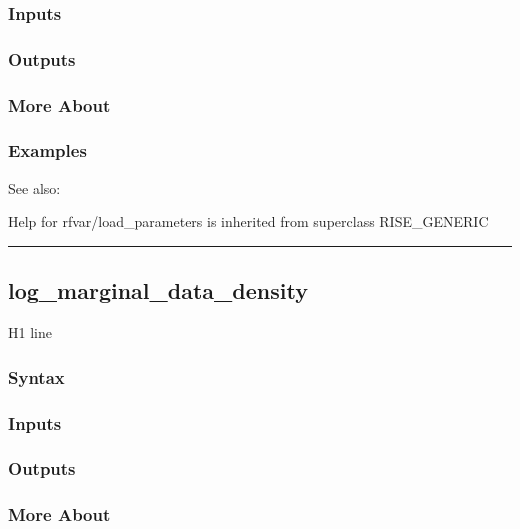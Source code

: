 \documentclass[letterpaper,10pt,english]{sphinxmanual}
\begin{document}
\subsubsection{Inputs}
\label{classes/models/@rfvar/rfvar:id48}

\subsubsection{Outputs}
\label{classes/models/@rfvar/rfvar:id49}

\subsubsection{More About}
\label{classes/models/@rfvar/rfvar:id50}

\subsubsection{Examples}
\label{classes/models/@rfvar/rfvar:id51}
See also:

Help for rfvar/load\_parameters is inherited from superclass RISE\_GENERIC


\bigskip\hrule{}\bigskip



\subsection{log\_marginal\_data\_density}
\label{classes/models/@rfvar/rfvar:log-marginal-data-density}\label{classes/models/@rfvar/rfvar:id52}
H1 line


\subsubsection{Syntax}
\label{classes/models/@rfvar/rfvar:id53}

\subsubsection{Inputs}
\label{classes/models/@rfvar/rfvar:id54}

\subsubsection{Outputs}
\label{classes/models/@rfvar/rfvar:id55}

\subsubsection{More About}
\label{classes/models/@rfvar/rfvar:id56}
\end{document}

